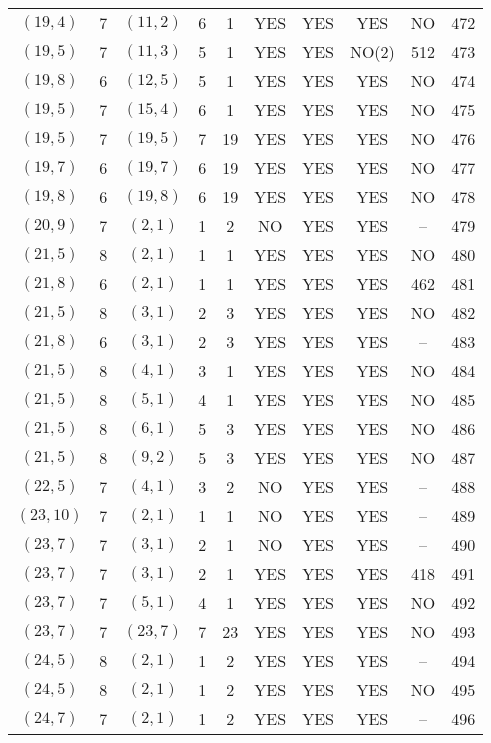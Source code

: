 \begin{longtable}{|c|c|c|c|c|c|c|c|c|c|}
$(19, 4)$ & 7 & $(11, 2)$ & 6 & 1 & YES & YES & YES & NO & 472\\
$(19, 5)$ & 7 & $(11, 3)$ & 5 & 1 & YES & YES & NO(2) & 512 & 473\\
$(19, 8)$ & 6 & $(12, 5)$ & 5 & 1 & YES & YES & YES & NO & 474\\
$(19, 5)$ & 7 & $(15, 4)$ & 6 & 1 & YES & YES & YES & NO & 475\\
$(19, 5)$ & 7 & $(19, 5)$ & 7 & 19 & YES & YES & YES & NO & 476\\
$(19, 7)$ & 6 & $(19, 7)$ & 6 & 19 & YES & YES & YES & NO & 477\\
$(19, 8)$ & 6 & $(19, 8)$ & 6 & 19 & YES & YES & YES & NO & 478\\
$(20, 9)$ & 7 & $(2, 1)$ & 1 & 2 & NO & YES & YES & -- & 479\\
$(21, 5)$ & 8 & $(2, 1)$ & 1 & 1 & YES & YES & YES & NO & 480\\
$(21, 8)$ & 6 & $(2, 1)$ & 1 & 1 & YES & YES & YES & 462 & 481\\
$(21, 5)$ & 8 & $(3, 1)$ & 2 & 3 & YES & YES & YES & NO & 482\\
$(21, 8)$ & 6 & $(3, 1)$ & 2 & 3 & YES & YES & YES & -- & 483\\
$(21, 5)$ & 8 & $(4, 1)$ & 3 & 1 & YES & YES & YES & NO & 484\\
$(21, 5)$ & 8 & $(5, 1)$ & 4 & 1 & YES & YES & YES & NO & 485\\
$(21, 5)$ & 8 & $(6, 1)$ & 5 & 3 & YES & YES & YES & NO & 486\\
$(21, 5)$ & 8 & $(9, 2)$ & 5 & 3 & YES & YES & YES & NO & 487\\
$(22, 5)$ & 7 & $(4, 1)$ & 3 & 2 & NO & YES & YES & -- & 488\\
$(23, 10)$ & 7 & $(2, 1)$ & 1 & 1 & NO & YES & YES & -- & 489\\
$(23, 7)$ & 7 & $(3, 1)$ & 2 & 1 & NO & YES & YES & -- & 490\\
$(23, 7)$ & 7 & $(3, 1)$ & 2 & 1 & YES & YES & YES & 418 & 491\\
$(23, 7)$ & 7 & $(5, 1)$ & 4 & 1 & YES & YES & YES & NO & 492\\
$(23, 7)$ & 7 & $(23, 7)$ & 7 & 23 & YES & YES & YES & NO & 493\\
$(24, 5)$ & 8 & $(2, 1)$ & 1 & 2 & YES & YES & YES & -- & 494\\
$(24, 5)$ & 8 & $(2, 1)$ & 1 & 2 & YES & YES & YES & NO & 495\\
$(24, 7)$ & 7 & $(2, 1)$ & 1 & 2 & YES & YES & YES & -- & 496\\

\end{longtable}
